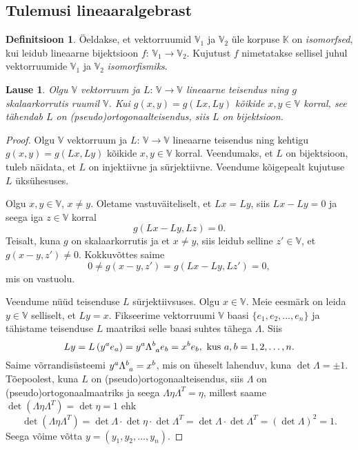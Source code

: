 \documentclass[12pt,a4paper,oneside]{article}
\theoremstyle{plain}
\newtheorem{lause}{Lause}[section]
\theoremstyle{definition}
\newtheorem{definitsioon}{Definitsioon}[section]
\numberwithin{equation}{section}
\def\K{{\mathbb K}}
\def\V{{\mathbb V}}
\begin{document}
\subsection{Tulemusi lineaaralgebrast} \label{eelteadmised:algebra}

\begin{definitsioon}
Öeldakse, et vektorruumid $\V_1$ ja $\V_2$ üle korpuse $\K$ on 
\emph{isomorfsed}, kui leidub lineaarne bijektsioon 
$f \colon\, \V_1 \rightarrow \V_2$. Kujutust $f$ nimetatakse sellisel 
juhul vektorruumide $\V_1$ ja $\V_2$ \emph{isomorfismiks}.
\end{definitsioon}

\begin{lause} \label{lemma:ort-skalaar-on-isomorfism}
Olgu $\V$ vektorruum ja 
$L \colon\, \V \rightarrow \V$ lineaarne teisendus ning 
$g$ skalaarkorrutis ruumil $\V$. Kui 
$g \left(x, y\right) = g \left(Lx, Ly\right)$ kõikide 
$x, y \in \V$ korral, see tähendab $L$ on 
(pseudo)ortogonaalteisendus, siis $L$ on bijektsioon.
\end{lause}

\begin{proof}
Olgu $\V$ vektorruum ja $L \colon\, \V \rightarrow \V$ 
lineaarne teisendus ning kehtigu $g \left(x, y\right) = 
g \left(Lx, Ly\right)$ kõikide $x, y \in \V$ korral. 
Veendumaks, et $L$ on bijektsioon, tuleb näidata, et $L$ on 
injektiivne ja sürjektiivne. Veendume kõigepealt kujutuse 
$L$ üksühesuses.

Olgu $x, y \in \V$, $x \neq y$. Oletame vastuväiteliselt, 
et $Lx = Ly$, siis $Lx - Ly = 0$ ja seega iga $z \in \V$ korral
\begin{equation*}
g \left( Lx - Ly, Lz \right) = 0.
\end{equation*}
Teisalt, kuna $g$ on skalaarkorrutis ja et $x \neq y$, siis leidub 
selline $z' \in \V$, et $g \left( x - y, z' \right) \neq 0$. 
Kokkuvõttes saime
\begin{equation*}
0 \neq g \left (x-y,z'\right ) = g\left (Lx - Ly, Lz'\right ) = 0,
\end{equation*}
mis on vastuolu.

Veendume nüüd teisenduse $L$ sürjektiivsuses. Olgu $x \in \V$. 
Meie eesmärk on leida $y \in \V$ selliselt, et $Ly = x$. 
Fikseerime vektorruumi $\V$ baasi $\{e_1, e_2, \ldots, e_n\}$ 
ja tähistame teisenduse $L$ maatriksi selle baasi suhtes 
tähega $\Lambda$. Siis
\[Ly = L\left(y^a e_a\right) = y^a \Lambda\indices{^b_a}e_b = 
x^b e_b, \text{ kus } a,b = 1, 2, \ldots, n.\]
Saime võrrandisüsteemi $y^a \Lambda\indices{^b_a} = x^b$, mis on 
üheselt lahenduv, kuna $\det \Lambda = \pm 1$. 
Tõepoolest, kuna $L$ on (pseudo)ortogonaalteisendus, siis 
$\Lambda$ on (pseudo)ortogonaal\-maatriks ja seega 
$\Lambda \eta \Lambda^T = \eta$, millest saame 
$\det\left(\Lambda \eta \Lambda^T\right) = \det \eta = 1$ 
ehk
\[\det\left(\Lambda \eta \Lambda^T\right) = 
	\det\Lambda \cdot \det\eta \cdot \det\Lambda^T = 
	\det\Lambda \cdot \det\Lambda^T = \left(\det\Lambda\right)^2 = 1.\]
Seega võime võtta 
$y = (y_1, y_2, \ldots, y_n)$.
\end{proof}
\end{document}
